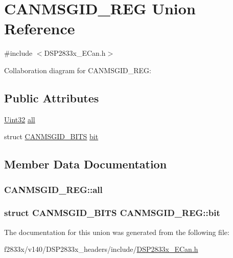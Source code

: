 \hypertarget{union_c_a_n_m_s_g_i_d___r_e_g}{}\section{C\+A\+N\+M\+S\+G\+I\+D\+\_\+\+R\+E\+G Union Reference}
\label{union_c_a_n_m_s_g_i_d___r_e_g}


{\ttfamily \#include $<$D\+S\+P2833x\+\_\+\+E\+Can.\+h$>$}



Collaboration diagram for C\+A\+N\+M\+S\+G\+I\+D\+\_\+\+R\+E\+G\+:
\subsection*{Public Attributes}
\begin{DoxyCompactItemize}
\item 
\hyperlink{_d_s_p2833x___device_8h_aba99025e657f892beb7ff31cecf64653}{Uint32} \hyperlink{union_c_a_n_m_s_g_i_d___r_e_g_aff6f0b32c30df9c507be9fa2e6a0b09d}{all}
\item 
struct \hyperlink{struct_c_a_n_m_s_g_i_d___b_i_t_s}{C\+A\+N\+M\+S\+G\+I\+D\+\_\+\+B\+I\+T\+S} \hyperlink{union_c_a_n_m_s_g_i_d___r_e_g_a04c33251a72a210665ee33cff1a1fd9b}{bit}
\end{DoxyCompactItemize}


\subsection{Member Data Documentation}
\hypertarget{union_c_a_n_m_s_g_i_d___r_e_g_aff6f0b32c30df9c507be9fa2e6a0b09d}{}
\subsubsection[{all}]{ C\+A\+N\+M\+S\+G\+I\+D\+\_\+\+R\+E\+G\+::all}\label{union_c_a_n_m_s_g_i_d___r_e_g_aff6f0b32c30df9c507be9fa2e6a0b09d}
\hypertarget{union_c_a_n_m_s_g_i_d___r_e_g_a04c33251a72a210665ee33cff1a1fd9b}{}
\subsubsection[{bit}]{\setlength{\rightskip}{0pt plus 5cm}struct {\bf C\+A\+N\+M\+S\+G\+I\+D\+\_\+\+B\+I\+T\+S} C\+A\+N\+M\+S\+G\+I\+D\+\_\+\+R\+E\+G\+::bit}\label{union_c_a_n_m_s_g_i_d___r_e_g_a04c33251a72a210665ee33cff1a1fd9b}


The documentation for this union was generated from the following file\+:\begin{DoxyCompactItemize}
\item 
f2833x/v140/\+D\+S\+P2833x\+\_\+headers/include/\hyperlink{_d_s_p2833x___e_can_8h}{D\+S\+P2833x\+\_\+\+E\+Can.\+h}\end{DoxyCompactItemize}
